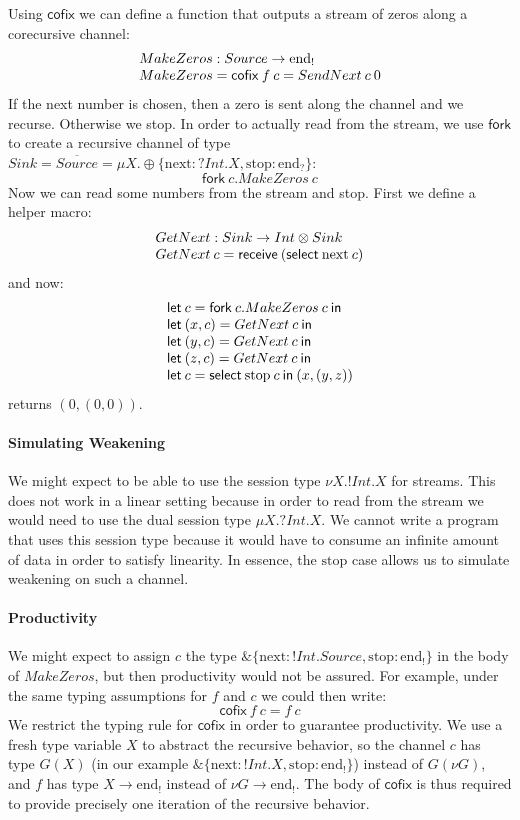 \documentclass[orivec,envcountsame]{llncs}
\makeatletter
\newcommand{\with}{\mathbin\binampersand}
\newcommand{\gvdual}[1]{\overline{#1}}
\newcommand{\uto}{\ensuremath{\rightarrow}}
\newcommand{\outterm}{\mathrm{end}_!}
\newcommand{\interm}{\mathrm{end}_?}
\newcommand{\mkwd}[1]{\mathsf{#1}}
\newcommand{\clabel}[1]{\mathrm{#1}}
\newcommand{\gvreceive}[1]{\mkwd{receive}\:#1}
\newcommand{\gvselect}[2]{\mkwd{select}\:#1\:#2}
\newcommand{\gvfork}[2]{\mkwd{fork}\:#1.#2}
\newcommand{\lrkwd}{\mkwd{cofix}}
\newcommand{\key}{\mkwd}
\newcommand{\cofix}{\lrkwd}
\newcommand{\ba}{\begin{array}}
\newcommand{\ea}{\end{array}}
\newcommand{\bl}{\ba[t]{@{}l@{}}}
\newcommand{\el}{\ea}
\makeatother
\begin{document}
Using $\cofix$ we can define a function that outputs a stream of zeros along a corecursive
channel:
\[
  \bl
  MakeZeros : Source \uto \outterm \\
  MakeZeros = \cofix\:f\:c = SendNext\:c\:0
  \el
\]
If the next number is chosen, then a zero is sent along the channel and we recurse. Otherwise we
stop.
%
In order to actually read from the stream, we use $\key{fork}$ to create a recursive channel of type
$Sink = \gvdual{Source} = \mu X.\oplus\{\clabel{next}: ?Int.X, \clabel{stop}: \interm \}$:
\[
\gvfork{c}{MakeZeros\:c}
\]
%
Now we can read some numbers from the stream and stop. First we define a helper macro:
\[
\bl
GetNext : Sink \uto Int \otimes Sink \\
GetNext\:c = \gvreceive{(\gvselect{\clabel{next}}{c})} \\
\el
\]
and now:
\[
\bl
\key{let}\:c = \gvfork{c}{MakeZeros\:c}\:\key{in} \\
\key{let}\:(x, c) = GetNext\:c\:\key{in} \\
\key{let}\:(y, c) = GetNext\:c\:\key{in} \\
\key{let}\:(z, c) = GetNext\:c\:\key{in} \\
\key{let}\:c = \gvselect{\clabel{stop}}{c}\:\key{in}\:(x, (y, z)) \\
\el
\]
returns $(0, (0, 0))$.

\paragraph{Simulating Weakening}
We might expect to be able to use the session type $\nu X.!Int.X$ for streams. This does not work in
a linear setting because in order to read from the stream we would need to use the dual session type
$\mu X.?Int.X$. We cannot write a program that uses this session type because it would have to
consume an infinite amount of data in order to satisfy linearity. In essence, the $\clabel{stop}$
case allows us to simulate weakening on such a channel.

\paragraph{Productivity}
We might expect to assign $c$ the type $\with \{\clabel{next}: !Int.Source, \clabel{stop}: \outterm
\}$ in the body of $MakeZeros$, but then productivity would not be assured. For example, under the
same typing assumptions for $f$ and $c$ we could then write:
\[
\cofix\:f\:c = f\:c
\]
%
We restrict the typing rule for $\cofix$ in order to guarantee productivity. We use a fresh type
variable $X$ to abstract the recursive behavior, so the channel $c$ has type $G(X)$ (in our example
$\with \{\clabel{next}: !Int.X, \clabel{stop}: \outterm \}$) instead of $G(\nu G)$, and $f$ has type
$X \uto \outterm$ instead of $\nu G \uto \outterm$. The body of $\cofix$ is thus required to provide
precisely one iteration of the recursive behavior.
\end{document}
